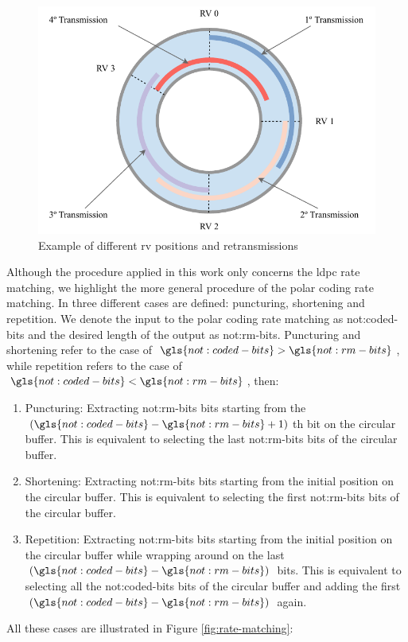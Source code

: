 \begin{figure}[htb]
    \includegraphics[width=0.8\columnwidth]{figures/chp_theory/rate-matching-rv.pdf}
    \caption{Example of different \gls{rv} positions and retransmissions}
    \label{fig:rate-match-rv}
\end{figure}


Although the procedure applied in this work only concerns the \gls{ldpc} rate matching, we highlight the more general procedure of the polar coding rate matching.
%
In \cite{Hui2018} three different cases are defined: puncturing, shortening and repetition.
%
We denote the input to the polar coding rate matching as \gls{not:coded-bits} and the desired length of the output as \gls{not:rm-bits}.
%
Puncturing and shortening refer to the case of $\gls{not:coded-bits} > \gls{not:rm-bits}$, while repetition refers to the case of $\gls{not:coded-bits} < \gls{not:rm-bits}$, then:
%
\begin{enumerate}
    \item Puncturing: Extracting \gls{not:rm-bits} bits starting from the $(\gls{not:coded-bits} - \gls{not:rm-bits} + 1)$th bit on the circular buffer. This is equivalent to selecting the last \gls{not:rm-bits} bits of the circular buffer.
    \item Shortening: Extracting \gls{not:rm-bits} bits starting from the initial position on the circular buffer. This is equivalent to selecting the first \gls{not:rm-bits} bits of the circular buffer.
    \item Repetition: Extracting \gls{not:rm-bits} bits starting from the initial position on the circular buffer while wrapping around on the last $(\gls{not:coded-bits} - \gls{not:rm-bits})$ bits. This is equivalent to selecting all the \gls{not:coded-bits} bits of the circular buffer and adding the first $(\gls{not:coded-bits} - \gls{not:rm-bits})$ again.
\end{enumerate}
%
All these cases are illustrated in Figure \ref{fig:rate-matching}:

